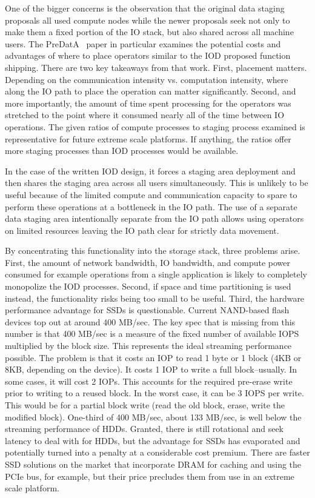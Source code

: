 \documentclass[conference]{sig-alt-gov2}
\begin{document}
One of the bigger concerns is the observation that the original data staging
proposals all used compute nodes while the newer proposals seek not only to
make them a fixed portion of the IO stack, but also shared across all machine
users. The PreDatA~\cite{zheng:2010:predata} paper in particular examines the
potential costs and advantages of where to place operators similar to the IOD
proposed function shipping. There are two key takeaways from that work. First,
placement matters.  Depending on the communication intensity vs. computation
intensity, where along the IO path to place the operation can matter
significantly. Second, and more importantly, the amount of time spent
processing for the operators was stretched to the point where it consumed
nearly all of the time between IO operations. The given ratios of compute
processes to staging process examined is representative for future extreme
scale platforms. If anything, the ratios offer more staging processes than IOD
processes would be available.

In the case of the written IOD design, it forces a staging area deployment and
then shares the staging area across all users simultaneously. This is unlikely
to be useful because of the limited compute and communication capacity to spare
to perform these operations at a bottleneck in the IO path. The use of a
separate data staging area intentionally separate from the IO path allows using
operators on limited resources leaving the IO path clear for strictly data
movement.

By concentrating this functionality into the storage stack, three problems
arise.  First, the amount of network bandwidth, IO bandwidth, and compute power
consumed for example operations from a single application is likely to
completely monopolize the IOD processes. Second, if space and time partitioning
is used instead, the functionality risks being too small to be useful. Third,
the hardware performance advantage for SSDs is questionable. Current NAND-based
flash devices top out at around 400 MB/sec. The key spec that is missing from
this number is that 400 MB/sec is a measure of the fixed number of available
IOPS multiplied by the block size. This represents the ideal streaming
performance possible. The problem is that it costs an IOP to read 1 byte or 1
block (4KB or 8KB, depending on the device). It costs 1 IOP to write a full
block--usually. In some cases, it will cost 2 IOPs.  This accounts for the
required pre-erase write prior to writing to a reused block. In the worst case,
it can be 3 IOPS per write. This would be for a partial block write (read the
old block, erase, write the modified block). One-third of 400 MB/sec, about 133
MB/sec, is well below the streaming performance of HDDs.  Granted, there is
still rotational and seek latency to deal with for HDDs, but the advantage for
SSDs has evaporated and potentially turned into a penalty at a considerable
cost premium.  There are faster SSD solutions on the market that incorporate
DRAM for caching and using the PCIe bus, for example, but their price precludes
them from use in an extreme scale platform.
\end{document}
